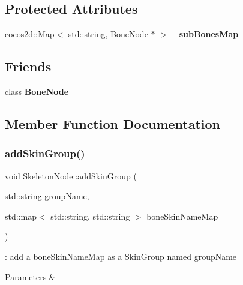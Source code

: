 \subsection*{Protected Attributes}
\begin{DoxyCompactItemize}
\item 
\mbox{\label{classSkeletonNode_ad700106dc61eb6842f8782024c850156}} 
cocos2d\+::\+Map$<$ std\+::string, \hyperlink{classBoneNode}{Bone\+Node} $\ast$ $>$ {\bfseries \+\_\+sub\+Bones\+Map}
\end{DoxyCompactItemize}
\subsection*{Friends}
\begin{DoxyCompactItemize}
\item 
\mbox{\label{classSkeletonNode_a9d5b0387434f4e85a331d0ce1227a4d0}} 
class {\bfseries Bone\+Node}
\end{DoxyCompactItemize}


\subsection{Member Function Documentation}
\mbox{\label{classSkeletonNode_ae4cfa9a616beff4fac44faca5bced45b}} 
\subsubsection{\texorpdfstring{add\+Skin\+Group()}{addSkinGroup()}\hspace{0.1cm}{\footnotesize\ttfamily [1/2]}}
{\footnotesize\ttfamily void Skeleton\+Node\+::add\+Skin\+Group (\begin{DoxyParamCaption}\item[{std\+::string}]{group\+Name,  }\item[{std\+::map$<$ std\+::string, std\+::string $>$}]{bone\+Skin\+Name\+Map }\end{DoxyParamCaption})}



\+: add a bone\+Skin\+Name\+Map as a Skin\+Group named group\+Name 


\begin{DoxyParams}{Parameters}
{\em } & \\
\hline
\end{DoxyParams}
\mbox{\label{classSkeletonNode_ae4cfa9a616beff4fac44faca5bced45b}} 
